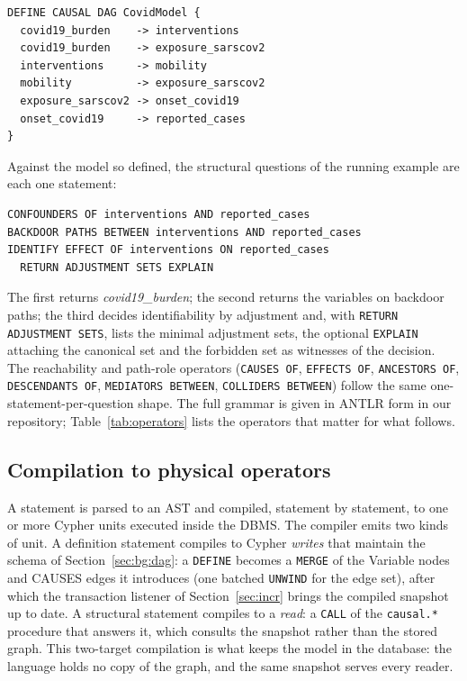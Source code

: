 \begin{lstlisting}[style=causaldsl]
DEFINE CAUSAL DAG CovidModel {
  covid19_burden    -> interventions
  covid19_burden    -> exposure_sarscov2
  interventions     -> mobility
  mobility          -> exposure_sarscov2
  exposure_sarscov2 -> onset_covid19
  onset_covid19     -> reported_cases
}
\end{lstlisting}

\noindent
Against the model so defined, the structural questions of the running example
are each one statement:

\begin{lstlisting}[style=causaldsl]
CONFOUNDERS OF interventions AND reported_cases
BACKDOOR PATHS BETWEEN interventions AND reported_cases
IDENTIFY EFFECT OF interventions ON reported_cases
  RETURN ADJUSTMENT SETS EXPLAIN
\end{lstlisting}

\noindent
The first returns \textit{covid19\_burden}; the second returns the variables
on backdoor paths; the third decides identifiability by adjustment and, with
\lstinline[style=causaldsl]|RETURN ADJUSTMENT SETS|, lists the minimal
adjustment sets, the optional \lstinline[style=causaldsl]|EXPLAIN| attaching
the canonical set and the forbidden set as witnesses of the decision. The
reachability and path-role operators
(\lstinline[style=causaldsl]|CAUSES OF|, \lstinline[style=causaldsl]|EFFECTS OF|,
\lstinline[style=causaldsl]|ANCESTORS OF|, \lstinline[style=causaldsl]|DESCENDANTS OF|,
\lstinline[style=causaldsl]|MEDIATORS BETWEEN|, \lstinline[style=causaldsl]|COLLIDERS BETWEEN|)
follow the same one-statement-per-question shape. The full grammar is given in
ANTLR form in our repository; Table~\ref{tab:operators} lists the operators
that matter for what follows.

\subsection{Compilation to physical operators}\label{sec:lang:compile}

A statement is parsed to an AST and compiled, statement by statement, to one or
more Cypher units executed inside the DBMS. The compiler emits two kinds of
unit. A definition statement compiles to Cypher \textit{writes} that maintain
the schema of Section~\ref{sec:bg:dag}: a \lstinline[style=causaldsl]|DEFINE|
becomes a \texttt{MERGE} of the \textsf{Variable} nodes and \textsf{CAUSES}
edges it introduces (one batched \texttt{UNWIND} for the edge set), after
which the transaction listener of Section~\ref{sec:incr} brings the compiled
snapshot up to date. A structural statement compiles to a \textit{read}: a
\texttt{CALL} of the \texttt{causal.*} procedure that answers it, which
consults the snapshot rather than the stored graph. This two-target
compilation is what keeps the model in the database: the language holds no
copy of the graph, and the same snapshot serves every reader.

